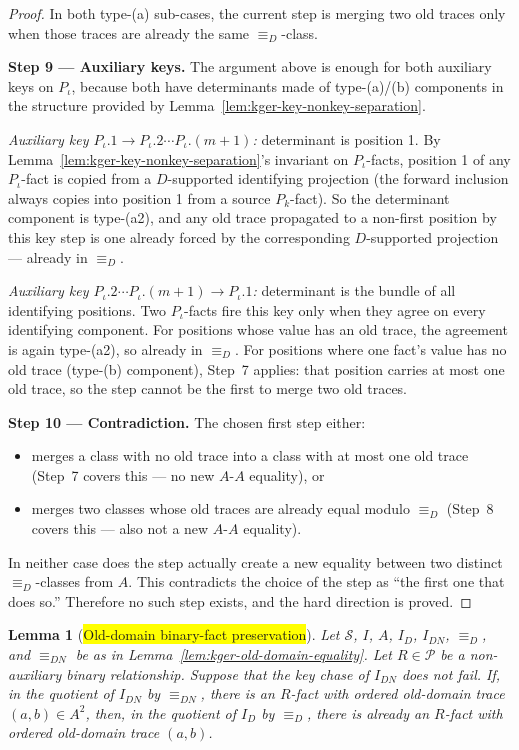 \documentclass[10pt]{article}
\newtheorem{lemma}{Lemma}
\begin{document}
\begin{proof}
In both type-(a) sub-cases, the current step is merging two old traces
only when those traces are already the same \(\equiv_D\)-class.

\smallskip\noindent\textbf{Step 9 --- Auxiliary keys.}
The argument above is enough for both auxiliary keys on \(P_\iota\),
because both have determinants made of type-(a)/(b) components in the
structure provided by Lemma~\ref{lem:kger-key-nonkey-separation}.

\emph{Auxiliary key \(P_\iota.1\to P_\iota.2\cdots P_\iota.(m+1)\):}
determinant is position 1.  By
Lemma~\ref{lem:kger-key-nonkey-separation}'s invariant on
\(P_\iota\)-facts, position 1 of any \(P_\iota\)-fact is copied from a
\(D\)-supported identifying projection (the forward inclusion always
copies into position 1 from a source \(P_k\)-fact).  So the determinant
component is type-(a2), and any old trace propagated to a non-first
position by this key step is one already forced by the corresponding
\(D\)-supported projection --- already in \(\equiv_D\).

\emph{Auxiliary key \(P_\iota.2\cdots P_\iota.(m+1)\to P_\iota.1\):}
determinant is the bundle of all identifying positions.  Two
\(P_\iota\)-facts fire this key only when they agree on every
identifying component.  For positions whose value has an old trace,
the agreement is again type-(a2), so already in \(\equiv_D\).  For
positions where one fact's value has no old trace (type-(b) component),
Step~7 applies: that position carries at most one old trace, so the
step cannot be the first to merge two old traces.

\smallskip\noindent\textbf{Step 10 --- Contradiction.}
The chosen first step either:
\begin{itemize}
\item merges a class with no old trace into a class with at most one
old trace (Step~7 covers this --- no new \(A\)-\(A\) equality), or
\item merges two classes whose old traces are already equal modulo
\(\equiv_D\) (Step~8 covers this --- also not a new \(A\)-\(A\)
equality).
\end{itemize}
In neither case does the step actually create a new equality between
two distinct \(\equiv_D\)-classes from \(A\).  This contradicts the
choice of the step as ``the first one that does so.''  Therefore no
such step exists, and the hard direction is proved.
\end{proof}

\begin{lemma}[\colorbox{yellow}{Old-domain binary-fact preservation}]
\label{lem:kger-old-domain-binary-fact}
Let \(\mathcal S\), \(I\), \(A\), \(I_D\), \(I_{DN}\),
\(\equiv_D\), and \(\equiv_{DN}\) be as in
Lemma~\ref{lem:kger-old-domain-equality}.  Let \(R\in\mathcal P\) be a
non-auxiliary binary relationship.  Suppose that the key chase of
\(I_{DN}\) does not fail.  If, in the quotient of \(I_{DN}\) by
\(\equiv_{DN}\), there is an \(R\)-fact with ordered old-domain trace
\((a,b)\in A^2\), then, in the quotient of \(I_D\) by \(\equiv_D\),
there is already an \(R\)-fact with ordered old-domain trace \((a,b)\).
\end{lemma}
\end{document}
